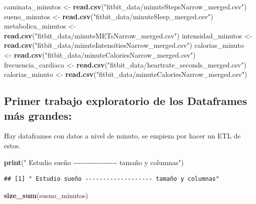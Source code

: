 \documentclass[
]{article}
\newenvironment{Shaded}{\begin{snugshade}}{\end{snugshade}}
\newcommand{\FunctionTok}[1]{\textcolor[rgb]{0.13,0.29,0.53}{\textbf{#1}}}
\newcommand{\NormalTok}[1]{#1}
\newcommand{\OtherTok}[1]{\textcolor[rgb]{0.56,0.35,0.01}{#1}}
\newcommand{\StringTok}[1]{\textcolor[rgb]{0.31,0.60,0.02}{#1}}
\begin{document}
\begin{Shaded}
\begin{Highlighting}[]
\NormalTok{caminata\_minutos }\OtherTok{\textless{}{-}} \FunctionTok{read.csv}\NormalTok{(}\StringTok{"fitbit\_data/minuteStepsNarrow\_merged.csv"}\NormalTok{)}
\NormalTok{sueno\_minutos }\OtherTok{\textless{}{-}} \FunctionTok{read.csv}\NormalTok{(}\StringTok{"fitbit\_data/minuteSleep\_merged.csv"}\NormalTok{)}
\NormalTok{metabolica\_minutos }\OtherTok{\textless{}{-}} \FunctionTok{read.csv}\NormalTok{(}\StringTok{"fitbit\_data/minuteMETsNarrow\_merged.csv"}\NormalTok{)}
\NormalTok{intensidad\_minutos }\OtherTok{\textless{}{-}} \FunctionTok{read.csv}\NormalTok{(}\StringTok{"fitbit\_data/minuteIntensitiesNarrow\_merged.csv"}\NormalTok{)}
\NormalTok{calorias\_minuto }\OtherTok{\textless{}{-}} \FunctionTok{read.csv}\NormalTok{(}\StringTok{"fitbit\_data/minuteCaloriesNarrow\_merged.csv"}\NormalTok{)}
\NormalTok{frecuencia\_cardiaca }\OtherTok{\textless{}{-}} \FunctionTok{read.csv}\NormalTok{(}\StringTok{"fitbit\_data/heartrate\_seconds\_merged.csv"}\NormalTok{)}
\NormalTok{calorias\_minuto }\OtherTok{\textless{}{-}} \FunctionTok{read.csv}\NormalTok{(}\StringTok{"fitbit\_data/minuteCaloriesNarrow\_merged.csv"}\NormalTok{)}
\end{Highlighting}
\end{Shaded}

\subsection{Primer trabajo exploratorio de los Dataframes más
grandes:}\label{primer-trabajo-exploratorio-de-los-dataframes-muxe1s-grandes}

Hay dataframes con datos a nivel de minuto, se empieza por hacer un ETL
de estos.

\begin{Shaded}
\begin{Highlighting}[]
\FunctionTok{print}\NormalTok{(}\StringTok{" Estudio sueño {-}{-}{-}{-}{-}{-}{-}{-}{-}{-}{-}{-}{-}{-}{-}{-}{-}{-}{-} tamaño y columnas"}\NormalTok{)}
\end{Highlighting}
\end{Shaded}

\begin{verbatim}
## [1] " Estudio sueño ------------------- tamaño y columnas"
\end{verbatim}

\begin{Shaded}
\begin{Highlighting}[]
\FunctionTok{size\_sum}\NormalTok{(sueno\_minutos)}
\end{Highlighting}
\end{Shaded}
\end{document}
